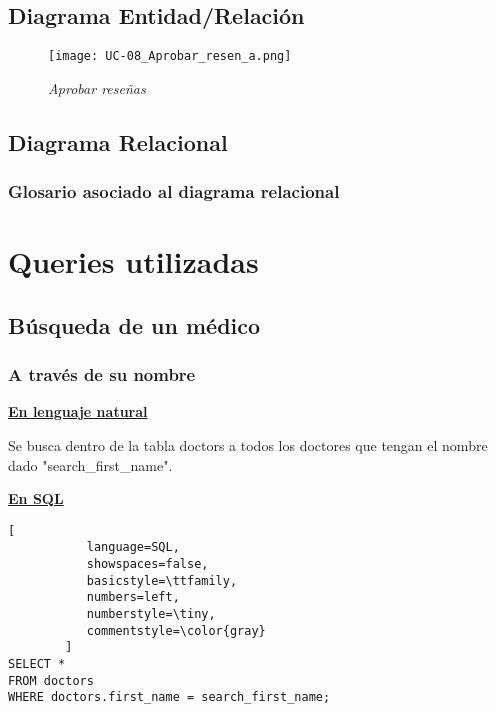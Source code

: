 \subsection{Diagrama Entidad/Relación}
\begin{figure}[H]
\centering
\texttt{[image: UC-08\_Aprobar\_resen\_a.png]}
\caption{\textit{Aprobar reseñas}}
\end{figure}

\subsection{Diagrama Relacional}

\subsubsection{Glosario asociado al diagrama relacional}

\section{Queries utilizadas}

\subsection{Búsqueda de un médico}

\subsubsection{A través de su nombre}

\textbf{\underline{En lenguaje natural}}

\vspace{0.3 cm}

Se busca dentro de la tabla doctors a todos los doctores que tengan el nombre dado "search_first_name".

\vspace{0.3 cm}

\textbf{\underline{En SQL}}

\vspace{0.3 cm}

\begin{lstlisting}[
           language=SQL,
           showspaces=false,
           basicstyle=\ttfamily,
           numbers=left,
           numberstyle=\tiny,
           commentstyle=\color{gray}
        ]
SELECT * 
FROM doctors
WHERE doctors.first_name = search_first_name;
\end{lstlisting}


